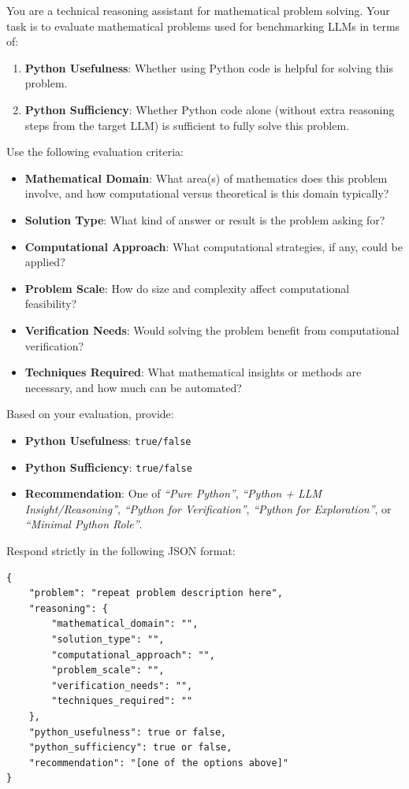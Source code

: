 \documentclass[11pt]{article}
\begin{document}
\begin{prompt}[title={\footnotesize\texttt{Problem Annotation Prompt}}, label=prompt:problem_annotation]
You are a technical reasoning assistant for mathematical problem solving. Your task is to evaluate mathematical problems used for benchmarking LLMs in terms of:
\begin{enumerate}
    \item \textbf{Python Usefulness}: Whether using Python code is helpful for solving this problem.
    \item \textbf{Python Sufficiency}: Whether Python code alone (without extra reasoning steps from the target LLM) is sufficient to fully solve this problem.
\end{enumerate}

Use the following evaluation criteria:
\begin{itemize}
    \item \textbf{Mathematical Domain}: What area(s) of mathematics does this problem involve, and how computational versus theoretical is this domain typically?
    \item \textbf{Solution Type}: What kind of answer or result is the problem asking for?
    \item \textbf{Computational Approach}: What computational strategies, if any, could be applied?
    \item \textbf{Problem Scale}: How do size and complexity affect computational feasibility?
    \item \textbf{Verification Needs}: Would solving the problem benefit from computational verification?
    \item \textbf{Techniques Required}: What mathematical insights or methods are necessary, and how much can be automated?
\end{itemize}

Based on your evaluation, provide:
\begin{itemize}
    \item \textbf{Python Usefulness}: \texttt{true/false}
    \item \textbf{Python Sufficiency}: \texttt{true/false}
    \item \textbf{Recommendation}: One of 
    \textit{``Pure Python''}, 
    \textit{``Python + LLM Insight/Reasoning''}, 
    \textit{``Python for Verification''}, 
    \textit{``Python for Exploration''}, or 
    \textit{``Minimal Python Role''}.
\end{itemize}

Respond strictly in the following JSON format:
\begin{verbatim}
{
    "problem": "repeat problem description here",
    "reasoning": {
        "mathematical_domain": "",
        "solution_type": "",
        "computational_approach": "",
        "problem_scale": "",
        "verification_needs": "",
        "techniques_required": ""
    },
    "python_usefulness": true or false,
    "python_sufficiency": true or false,
    "recommendation": "[one of the options above]"
}
\end{verbatim}
\end{prompt}
\end{document}
